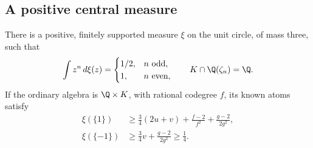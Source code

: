 \subsection{A positive central measure}
\begin{proposition}\label{cub:prop:cubic-corrected-average}
There is a positive, finitely supported measure $\xi$ on the unit circle,
of mass three, such that
\[
 \int z^n\,d\xi(z)=
 \begin{cases}1/2,&n\text{ odd},\\1,&n\text{ even},\end{cases}
 \qquad K\cap\Q(\zeta_n)=\Q.
\]
If the ordinary algebra is $\Q\times K$, with rational codegree
$f$, its known atoms satisfy
\begin{align}
 \xi(\{1\})&\ge\frac34(2u+v)+\frac{f-2}{f^2}
                          +\frac{g-2}{2g^2},\label{cub:eq:positive-atom}\\
 \xi(\{-1\})&\ge\frac34v+\frac{g-2}{2g^2}\ge\frac14.
 \label{cub:eq:negative-atom}
\end{align}
\end{proposition}

